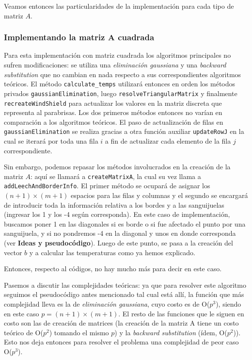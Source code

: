 Veamos entonces las particularidades de la implementación para cada tipo de matriz $A$.


\subsubsection{Implementando la matriz A cuadrada}

Para esta implementación con matriz cuadrada los algoritmos principales no sufren modificaciones: se utiliza una \textit{eliminación gaussiana} y una \textit{backward substitution} que no cambian en nada respecto a sus correspondientes algoritmos teóricos. El método \texttt{calculate\_temps} utilizará entonces en orden los métodos privados \texttt{gaussianElimination}, luego  \texttt{resolveTriangularMatrix} y finalmente \texttt{recreateWindShield} para actualizar los valores en la matriz discreta que representa al parabrisas. Los dos primeros métodos entonces no varían en comparación a los algoritmos teóricos. El paso de actualización de filas en \texttt{gaussianElimination} se realiza gracias a otra función auxiliar \texttt{updateRowJ} en la cual se iterará por toda una fila $i$ a fin de actualizar cada elemento de la fila $j$ correspondiente. 

Sin embargo, podemos repasar los métodos involucrados en la creación de la matriz $A$: aquí se llamará a \texttt{createMatrixA}, la cual su vez llama a \texttt{addLeechAndBorderInfo}. El primer método se ocupará de asignar los $(n+1) \times (m+1)$ espacios para las filas y columnas y el segundo se encargará de introducir toda la información relativa a los bordes y a las sanguijuelas (ingresar los 1 y los -4 según corresponda). En este caso de implementación, buscamos poner 1 en las diagonales si es borde o si fue afectado el punto por una sanguijuela, y si no pondremos -4 en la diagonal y unos en donde corresponda (ver \textbf{Ideas y pseudocódigo}). Luego de este punto, se pasa a la creación del vector $b$ y a calcular las temperaturas como ya hemos explicado.

Entonces, respecto al códigos, no hay mucho más para decir en este caso.

\vspace{\baselineskip}

Pasemos a discutir las complejidades teóricas: ya que para resolver este algoritmo seguimos el pseudocódigo antes mencionado tal cual está allí, la función que más complejidad lleva es la de \textit{eliminación gaussiana}, cuyo costo es de O($p^3$), siendo en este caso $p = (n+1) \times (m+1)$. El resto de las funciones que le siguen en costo son las de creación de matrices (la creación de la matriz A tiene un costo teórico de O($p^2$) tomando el mismo $p$) y la \textit{backward substitution} (ídem, O($p^2$)). Esto nos deja entonces para resolver el problema una complejidad de peor caso O($p^3$).

